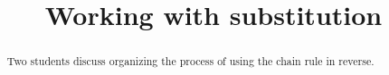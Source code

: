 \documentclass{ximera}
\title[Break-Ground:]{Working with substitution}
\begin{document}
\begin{abstract}
Two students discuss organizing the process of using the chain rule in reverse.
\end{abstract}
\maketitle







\end{document}
